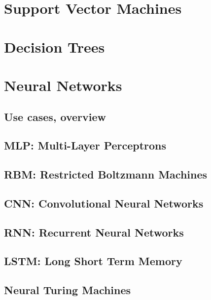 \documentclass[
10pt, %
a4paper, %
oneside, %
headinclude,footinclude, %
BCOR5mm, %
]{scrartcl}
\begin{document}
\section{Support Vector Machines}

\section{Decision Trees}

\section{Neural Networks}
\subsection{Use cases, overview}
\subsection{MLP: Multi-Layer Perceptrons}
\subsection{RBM: Restricted Boltzmann Machines}
\subsection{CNN: Convolutional Neural Networks}
\subsection{RNN: Recurrent Neural Networks}
\subsection{LSTM: Long Short Term Memory}
\subsection{Neural Turing Machines}
\end{document}
